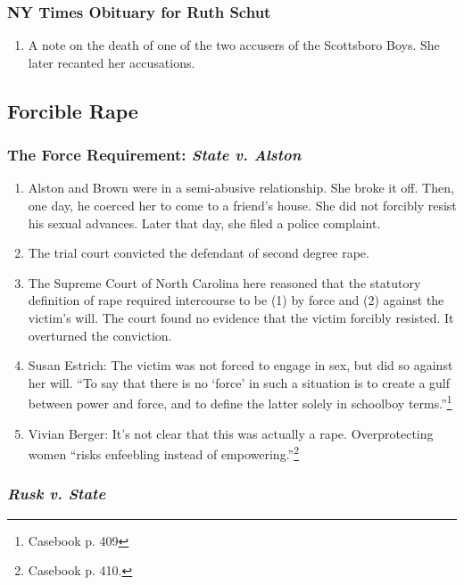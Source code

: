 \subsubsection{NY Times Obituary for Ruth Schut}

\begin{enumerate}
    \item A note on the death of one of the two accusers of the Scottsboro Boys. She later recanted her accusations.
\end{enumerate}

\subsection{Forcible Rape}

\subsubsection{The Force Requirement: \emph{State v. Alston}}

\begin{enumerate}
    \item Alston and Brown were in a semi-abusive relationship. She broke it off. Then, one day, he coerced her to come to a friend's house. She did not forcibly resist his sexual advances. Later that day, she filed a police complaint.
    \item The trial court convicted the defendant of second degree rape.
    \item The Supreme Court of North Carolina here reasoned that the statutory definition of rape required intercourse to be (1) by force and (2) against the victim's will. The court found no evidence that the victim forcibly resisted. It overturned the conviction.
    \item Susan Estrich: The victim was not forced to engage in sex, but did so against her will. ``To say that there is no `force' in such a situation is to create a gulf between power and force, and to define the latter solely in schoolboy terms.''\footnote{Casebook p. 409}
    \item Vivian Berger: It's not clear that this was actually a rape. Overprotecting women ``risks enfeebling instead of empowering.''\footnote{Casebook p. 410.}
\end{enumerate}

\subsubsection{\emph{Rusk v. State}}


